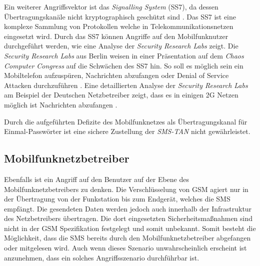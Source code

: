 \documentclass[11pt,a4paper,ngerman]{scrreprt}
\begin{document}
Ein weiterer Angriffsvektor ist das \textit{Signalling System} (SS7), da dessen Übertragungskanäle nicht kryptographisch geschützt sind \cite[S.\,202]{komSec13}. Das SS7 ist eine komplexe Sammlung von Protokollen welche in Telekommunikationsnetzen eingesetzt wird. Durch das SS7 können Angriffe auf den Mobilfunknutzer durchgeführt werden, wie eine Analyse der \textit{Security Research Labs} zeigt. Die \textit{Security Research Labs} aus Berlin weisen in einer Präsentation auf dem \textit{Chaos Computer Congress} auf die Schwächen des SS7 hin. So soll es möglich sein ein Mobiltelefon aufzuspüren, Nachrichten abzufangen oder Denial of Service Attacken durchzuführen \cite{cccMob}. Eine detaillierten Analyse der \textit{Security Research Labs} am Beispiel der Deutschen Netzbetreiber zeigt, dass es in einigen 2G Netzen möglich ist Nachrichten abzufangen \cite{srlMobSec}.

Durch die aufgeführten Defizite des Mobilfunknetzes als Übertragungskanal für Einmal-Passwörter ist eine sichere Zustellung der \textit{SMS-TAN} nicht gewährleistet.
\subsection*{Mobilfunknetzbetreiber}
Ebenfalls ist ein Angriff auf den Benutzer auf der Ebene des Mobilfunknetzbetreibers zu denken. Die Verschlüsselung von GSM agiert nur in der Übertragung von der Funkstation bis zum Endgerät, welches die SMS empfängt. Die gesendeten Daten werden jedoch auch innerhalb der Infrastruktur des Netzbetreibers übertragen. Die dort eingesetzten Sicherheitsmaßnahmen sind nicht in der GSM Spezifikation festgelegt und somit unbekannt. Somit besteht die Möglichkeit, dass die SMS bereits durch den Mobilfunknetzbetreiber abgefangen oder mitgelesen wird. Auch wenn dieses Szenario unwahrscheinlich erscheint ist anzunehmen, dass ein solches Angriffsszenario durchführbar ist.
\end{document}
